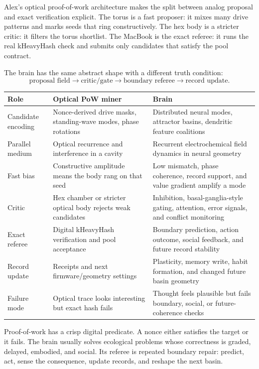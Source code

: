 \documentclass[11pt]{article}
\theoremstyle{remark}
\theoremstyle{plain}
\begin{document}
Alex's optical proof-of-work architecture makes the split between analog proposal and exact verification explicit. The torus is a fast proposer: it mixes many drive patterns and marks seeds that ring constructively. The hex body is a stricter critic: it filters the torus shortlist. The MacBook is the exact referee: it runs the real kHeavyHash check and submits only candidates that satisfy the pool contract.

The brain has the same abstract shape with a different truth condition:
\[
\boxed{
\text{proposal field}
\to
\text{critic/gate}
\to
\text{boundary referee}
\to
\text{record update}.
}
\]

\begin{longtable}{L{0.24\textwidth}L{0.34\textwidth}L{0.34\textwidth}}
\toprule
\textbf{Role} & \textbf{Optical PoW miner} & \textbf{Brain} \\
\midrule
\endhead
Candidate encoding & Nonce-derived drive masks, standing-wave modes, phase rotations & Distributed neural modes, attractor basins, dendritic feature coalitions \\
Parallel medium & Optical recurrence and interference in a cavity & Recurrent electrochemical field dynamics in neural geometry \\
Fast bias & Constructive amplitude means the body rang on that seed & Low mismatch, phase coherence, record support, and value gradient amplify a mode \\
Critic & Hex chamber or stricter optical body rejects weak candidates & Inhibition, basal-ganglia-style gating, attention, error signals, and conflict monitoring \\
Exact referee & Digital kHeavyHash verification and pool acceptance & Boundary prediction, action outcome, social feedback, and future record stability \\
Record update & Receipts and next firmware/geometry settings & Plasticity, memory write, habit formation, and changed future basin geometry \\
Failure mode & Optical trace looks interesting but exact hash fails & Thought feels plausible but fails boundary, social, or future-coherence checks \\
\bottomrule
\end{longtable}

Proof-of-work has a crisp digital predicate. A nonce either satisfies the target or it fails. The brain usually solves ecological problems whose correctness is graded, delayed, embodied, and social. Its referee is repeated boundary repair: predict, act, sense the consequence, update records, and reshape the next basin.
\end{document}
